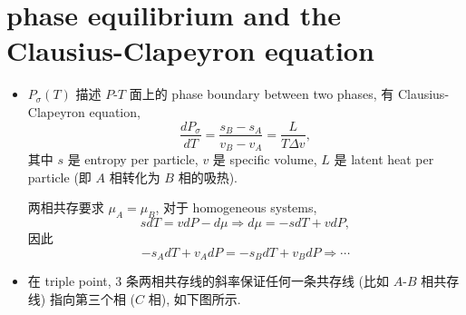 \section{phase equilibrium and the Clausius-Clapeyron equation}
\begin{itemize}
	\item $P_\sigma(T)$ 描述 $P$-$T$ 面上的 phase boundary between two phases, 有 Clausius-Clapeyron equation,
	\begin{equation}
		\frac{dP_\sigma}{dT} = \frac{s_B - s_A}{v_B - v_A} = \frac{L}{T \Delta v},
	\end{equation}
	其中 $s$ 是 entropy per particle, $v$ 是 specific volume, $L$ 是 latent heat per particle (即 $A$ 相转化为 $B$ 相的吸热).
	
	\begin{tcolorbox}[title=proof:]
		两相共存要求 $\mu_A = \mu_B$, 对于 homogeneous systems,
		\begin{equation}
			s dT = v dP - d\mu \Longrightarrow d\mu = - s dT + v dP,
		\end{equation}
		因此
		\begin{equation}
			- s_A dT + v_A dP = - s_B dT + v_B dP \Longrightarrow \cdots
		\end{equation}
	\end{tcolorbox}
	
	\item 在 triple point, 3 条两相共存线的斜率保证任何一条共存线 (比如 $A$-$B$ 相共存线) 指向第三个相 ($C$ 相), 如下图所示.
	

\end{itemize}
